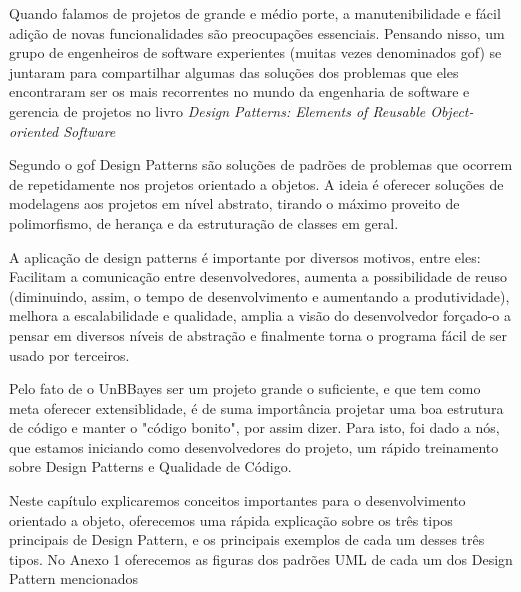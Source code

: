 
Quando falamos de projetos de grande e médio porte, a manutenibilidade e fácil adição de novas funcionalidades são preocupações essenciais. Pensando nisso, um grupo de engenheiros de software experientes (muitas vezes denominados \gls{gof}) se juntaram para compartilhar algumas das soluções dos problemas que eles encontraram ser os mais recorrentes no mundo da engenharia de software e gerencia de projetos no livro \textit{Design Patterns: Elements of Reusable Object-oriented Software}\cite{dpatterns95}

Segundo o \gls{gof} Design Patterns são soluções de padrões de problemas que ocorrem de repetidamente nos projetos orientado a objetos. A ideia é oferecer soluções de modelagens aos projetos em nível abstrato, tirando o máximo proveito de polimorfismo, de herança e da estruturação de classes em geral.

A aplicação de design patterns é importante por diversos motivos, entre eles: Facilitam a comunicação entre desenvolvedores, aumenta a possibilidade de reuso (diminuindo, assim, o tempo de desenvolvimento e aumentando a produtividade), melhora a escalabilidade e qualidade, amplia a visão do desenvolvedor forçado-o a pensar em diversos níveis de abstração e finalmente torna o programa fácil de ser usado por terceiros.

Pelo fato de o UnBBayes ser um projeto grande o suficiente, e que tem como meta oferecer extensiblidade, é de suma importância projetar uma boa estrutura de código e manter o "código bonito", por assim dizer. Para isto, foi dado a nós, que estamos iniciando como desenvolvedores do projeto, um rápido treinamento sobre Design Patterns e Qualidade de Código.

Neste capítulo explicaremos conceitos importantes para o desenvolvimento orientado a objeto, oferecemos uma rápida explicação sobre os três tipos principais de Design Pattern, e os principais exemplos de cada um desses três tipos. No Anexo 1 oferecemos as figuras dos padrões UML de cada um dos Design Pattern mencionados

